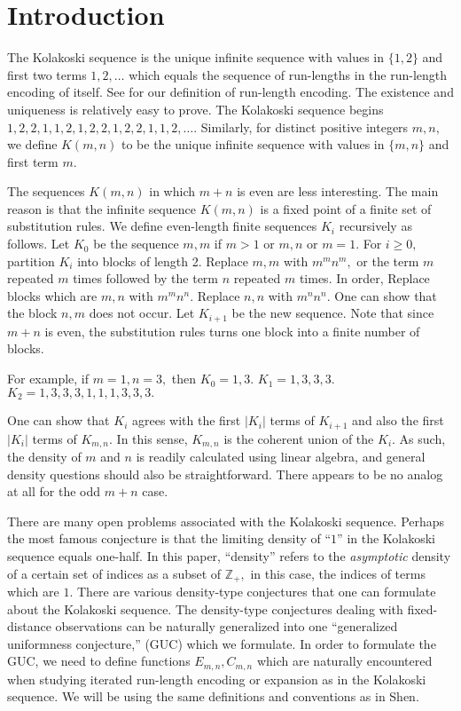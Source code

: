 \documentclass[11pt]{amsart} %
\begin{document}
\section{Introduction}
The Kolakoski sequence is the unique infinite sequence with values in $\{1, 2\}$ and first two terms $1, 2, \ldots$ which equals the sequence of run-lengths in the run-length encoding of itself. See \cite{RLE} for our definition of run-length encoding. The existence and uniqueness is relatively easy to prove. The Kolakoski sequence begins $1, 2, 2, 1, 1, 2, 1, 2, 2, 1, 2, 2, 1, 1, 2, \ldots.$ Similarly, for distinct positive integers $m, n,$ we define $K(m,n)$ to be the unique infinite sequence with values in $\{m, n\}$ and first term $m.$ 

The sequences $K(m,n)$ in which $m+n$ is even are less interesting. The main reason is that the infinite sequence $K(m,n)$ is a fixed point of a finite set of substitution rules. We define even-length finite sequences $K_i$ recursively as follows. Let $K_0$ be the sequence $m, m$ if $m>1$ or $m, n$ or $m = 1.$ For $i \ge 0,$ partition $K_i$ into blocks of length 2. Replace $m,m$ with $m^m n^m,$ or the term $m$ repeated $m$ times followed by the term $n$ repeated $m$ times. In order, Replace blocks which are $m, n$ with $m^m n^n.$ Replace $n, n$ with $m^n n^n.$ One can show that the block $n, m$ does not occur. Let $K_{i+1}$ be the new sequence. Note that since $m+n$ is even, the substitution rules turns one block into a finite number of blocks. 

For example, if $m = 1, n = 3,$ then $K_0 = 1, 3.$ $K_1 =1, 3, 3, 3.$ $K_2 = 1, 3, 3, 3, 1, 1, 1, 3, 3, 3.$ 

One can show that $K_i$ agrees with the first $|K_i|$ terms of $K_{i+1}$ and also the first $|K_i|$ terms of $K_{m, n}.$ In this sense, $K_{m, n}$ is the coherent union of the $K_i.$ As such, the density of $m$ and $n$ is readily calculated using linear algebra, and general density questions should also be straightforward. There appears to be no analog at all for the odd $m+n$ case.

There are many open problems associated with the Kolakoski sequence. Perhaps the most famous conjecture is that the limiting density of ``$1$'' in the Kolakoski sequence equals one-half. In this paper, ``density'' refers to the \textit{asymptotic} density \cite{OEIS} of a certain set of indices as a subset of $\mathbb{Z}_+,$ in this case, the indices of terms which are $1.$ There are various density-type conjectures that one can formulate about the Kolakoski sequence. The density-type conjectures dealing with fixed-distance observations can be naturally generalized into one ``generalized uniformness conjecture,'' (GUC) which we formulate. In order to formulate the GUC, we need to define functions $E_{m, n}, C_{m, n}$ which are naturally encountered when studying iterated run-length encoding or expansion as in the Kolakoski sequence. We will be using the same definitions and conventions as in Shen\cite{Shen}.
\end{document}
